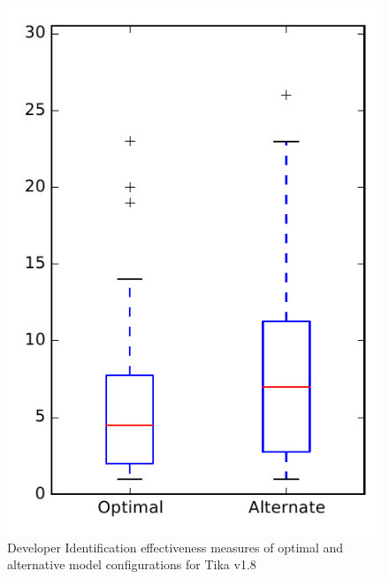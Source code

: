 
\begin{figure}
\centering
\includegraphics[height=0.4\textheight]{figures/combo/dit_rq1_tika}
\caption{Developer Identification effectiveness measures of optimal and alternative model configurations for Tika v1.8}
\label{fig:combo:dit:rq1:tika}
\end{figure}
